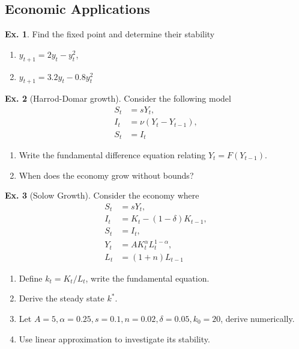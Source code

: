 \documentclass[11pt,a4paper]{book}
\theoremstyle{definition}\newtheorem{definition}{Definition}
\theoremstyle{definition}\newtheorem{fact}{Fact}
\theoremstyle{definition}\newtheorem{remark}{Remark}
\theoremstyle{definition}\newtheorem{ex}{Ex.}
\theoremstyle{definition}\newtheorem{project}{Project}
\theoremstyle{definition}\newtheorem{problem}{Problem}
\theoremstyle{definition}\newtheorem{example}{Example}
\numberwithin{theorem}{section}
\numberwithin{corollary}{chapter}
\numberwithin{assumption}{chapter}
\numberwithin{definition}{chapter}
\numberwithin{prop}{chapter}
\numberwithin{notation}{chapter}
\numberwithin{problem}{chapter}
\numberwithin{example}{chapter}
\numberwithin{fact}{chapter}
\numberwithin{ex}{chapter}
\begin{document}
	\subsection{Economic Applications}
	\begin{ex}
		Find the fixed point and determine their stability \citep[p.97]{shone2002economic}
		\begin{enumerate}
			\item $y_{t+1} = 2 y_t - y_t^2$, 
			\item $y_{t+1} = 3.2 y_t - 0.8 y_t^2$
		\end{enumerate}
	\end{ex}
	
	\begin{ex}[Harrod-Domar growth]
		Consider the following model
		\begin{align*}
			S_t &= sY_t, \\
			I_t &= \nu (Y_t - Y_{t-1}), \\
			S_t &= I_t
		\end{align*}
		\begin{enumerate}
			\item Write the fundamental difference equation relating $Y_t = F(Y_{t-1})$.
			\item When does the economy grow without bounds?
		\end{enumerate}
	\end{ex}
	
	\begin{ex}[Solow Growth]
		Consider the economy where
		\begin{align*}
			S_t &= sY_t, \\
			I_t &= K_t - (1 - \delta) K_{t-1}, \\
			S_t &= I_t, \\
			Y_t &= A K_t^\alpha L_t^{1-\alpha}, \\
			L_t &= (1+n) L_{t-1}
		\end{align*}
		\begin{enumerate}
			\item Define $k_t = K_t/L_t$, write the fundamental equation.
			\item Derive the steady state $k^*$.
			\item Let $A = 5, \alpha = 0.25, s = 0.1, n = 0.02, \delta = 0.05, k_0 =20$, derive numerically.
			\item Use linear approximation to investigate its stability.
		\end{enumerate}
	\end{ex}
	
\end{document}
